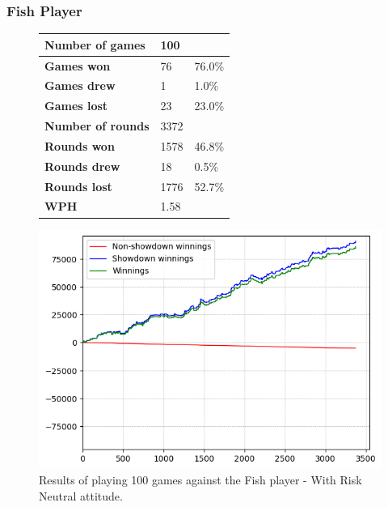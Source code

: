 \subsubsection{Fish Player}
\begin{figure}[H]
    \centering
    \begin{minipage}{\textwidth}
        \begin{minipage}{0.40\textwidth}
            \begin{tabular}{|l|l|l|}
                \hline
                \textbf{Number of games}  & 100   &        \\ \hline
                \textbf{Games won}        & 76    & 76.0\% \\ \hline
                \textbf{Games drew}       & 1     & 1.0\%  \\ \hline
                \textbf{Games lost}       & 23    & 23.0\% \\ \hline
                \textbf{Number of rounds} & 3372  &        \\ \hline
                \textbf{Rounds won}       & 1578   & 46.8\%  \\ \hline
                \textbf{Rounds drew}      & 18     & 0.5\%  \\ \hline
                \textbf{Rounds lost}      & 1776  & 52.7\% \\ \hline
                \textbf{WPH}              & 1.58 &        \\ \hline
            \end{tabular}
        \end{minipage}
        \hspace{0.05\textwidth}
        \begin{minipage}{0.5\textwidth}
            \includegraphics[width=\textwidth]{graphics/risk-neutral/fish.png}
        \end{minipage}
    \end{minipage}
    \caption{Results of playing 100 games against the Fish player - With Risk Neutral attitude.}
    \label{fig:results_neutral_fish}
\end{figure}

